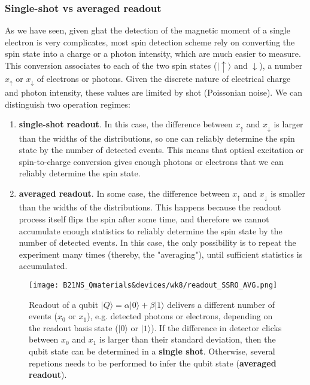 \documentclass[a4paper,11pt]{article}
\newcommand{\ket}[1]{| #1 \rangle}
\begin{document}
\subsubsection{Single-shot vs averaged readout}
As we have seen, given ghat the detection of the magnetic moment of a single electron is very complicates, most spin detection scheme rely on converting the spin state into a charge or a photon intensity, which are much easier to measure. This conversion associates to each of the two spin states ($\ket{\uparrow}$ and $\downarrow$), a number $x_{\uparrow}$ or $x_{\downarrow}$ of electrons or photons. Given the discrete nature of electrical charge and photon intensity, these values are limited by shot (Poissonian noise). We can distinguish two operation regimes:
\begin{enumerate}
    \item {\bf single-shot readout}. In this case, the difference between $x_{\uparrow}$ and $x_{\downarrow}$ is larger than the widths of the distributions, so one can reliably determine the spin state by the number of detected events. This means that optical excitation or spin-to-charge conversion gives enough photons or electrons that we can reliably determine the spin state.
    \item {\bf averaged readout}. In some case, the difference between $x_{\uparrow}$ and $x_{\downarrow}$ is smaller than the widths of the distributions. This happens because the readout process itself flips the spin after some time, and therefore we cannot accumulate enough statistics to reliably determine the spin state by the number of detected events. In this case, the only possibility is to repeat the experiment many times (thereby, the "averaging"), until sufficient statistics is accumulated.
\end{enumerate}

\begin{figure}[h]
\centering
\texttt{[image: B21NS\_Qmaterials\&devices/wk8/readout\_SSRO\_AVG.png]}
\caption{Readout of a qubit $\ket{Q} = \alpha \ket{0} + \beta \ket{1}$ delivers a different number of events ($x_0$ or $x_1$), e.g. detected photons or electrons, depending on the readout basis state ($\ket{0}$ or $\ket{1}$). If the difference in detector clicks between $x_0$ and $x_1$ is larger than their standard deviation, then the qubit state can be determined in a {\bf single shot}. Otherwise, several repetions needs to be performed to infer the qubit state ({\bf averaged readout}). }
\label{fig:SSRO}
\end{figure}
\end{document}
